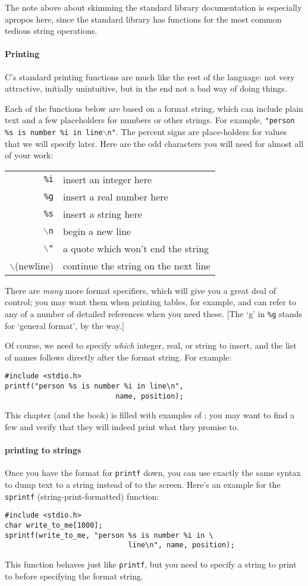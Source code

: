 \documentclass[12pt]{article}
\makeatletter
\def\ttind#1{\index{#1@{\tt #1}}{\tt #1}}
\makeatother
\begin{document}
The note above about skimming the standard library documentation is especially apropos here, since the
standard library has functions for the most common tedious string operations.

\paragraph{Printing} 
C's standard printing functions are much like the rest of the language: not very attractive, initially
unintuitive, but in the end not a bad way of doing things. 

Each of the functions below are based on a
format string, which can include plain text and a few placeholders for numbers or other strings. For
example, {\tt "person \%s is number \%i in line$\backslash$n"}. The percent signs are place-holders for values that we
will specify later. Here are the odd characters you will need for almost all of your work:

\begin{tabular}{rl}
{\tt \%i}	& insert an integer here\\
{\tt \%g}	& insert a real number here\\
{\tt \%s}	& insert a string here\\
{\tt $\backslash$n}	& begin a new line\\
{\tt $\backslash$"}	& a quote which won't end the string\\
$\backslash$(newline)	& continue the string on the next line
\end{tabular}

There are {\sl many} more format specifiers, which will give you a great deal of control; you may want
them when printing tables, for example, and can refer to any of a number of detailed references when you
need these. [The `g' in {\tt \%g} stands for `general format', by the way.]

Of course, we need to specify {\sl which} integer, real, or string to insert, and the list of names
follows directly after the format string. For example:
\begin{verbatim}
#include <stdio.h>
printf("person %s is number %i in line\n", 
                          name, position);
\end{verbatim}
This chapter (and the book) is filled with examples of \ttind{printf}; you may want to find a few and
verify that they will indeed print what they promise to.

\paragraph{printing to strings} Once you have the format for {\tt printf} down, you can use exactly the
same syntax to dump text to a string instead of to the screen. Here's an example for the {\tt sprintf}
(string-print-formatted) function:
\begin{verbatim}
#include <stdio.h>
char write_to_me[1000];
sprintf(write_to_me, "person %s is number %i in \
                             line\n", name, position);
\end{verbatim}
This function behaves just like {\tt printf}, but you need to specify
a string to print to before specifying the format string. 
\end{document}
